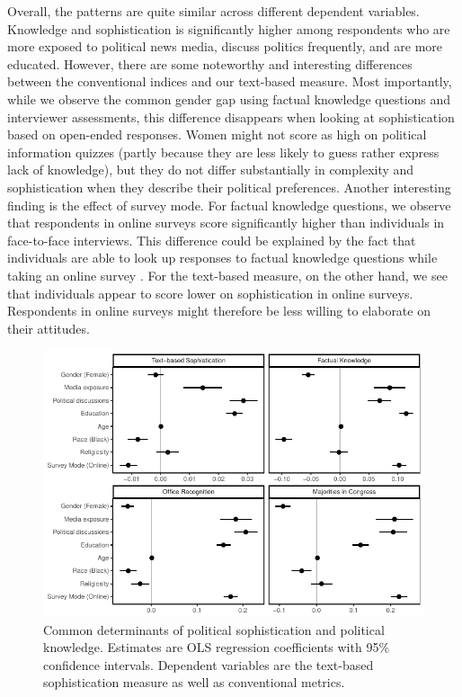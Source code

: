 \documentclass[12pt]{article}
\begin{document}
Overall, the patterns are quite similar across different dependent variables. Knowledge and sophistication is significantly higher among respondents who are more exposed to political news media, discuss politics frequently, and are more educated. However, there are some noteworthy and interesting differences between the conventional indices and our text-based measure. Most importantly, while we observe the common gender gap using factual knowledge questions and interviewer assessments, this difference disappears when looking at sophistication based on open-ended responses. Women might not score as high on political information quizzes (partly because they are less likely to guess rather express lack of knowledge), but they do not differ substantially in complexity and sophistication when they describe their political preferences. Another interesting finding is the effect of survey mode. For factual knowledge questions, we observe that respondents in online surveys score significantly higher than individuals in face-to-face interviews. This difference could be explained by the fact that individuals are able to look up responses to factual knowledge questions while taking an online survey \citep[see also][]{clifford2016cheating}. For the text-based measure, on the other hand, we see that individuals appear to score lower on sophistication in online surveys. Respondents in online surveys might therefore be less willing to elaborate on their attitudes.


\begin{figure}[h]\centering
\includegraphics{../fig/determinants.pdf}
\caption{Common determinants of political sophistication and political knowledge. Estimates are OLS regression coefficients with 95\% confidence intervals. Dependent variables are the text-based sophistication measure as well as conventional metrics.}\label{fig:determinants}
\end{figure}
\end{document}
